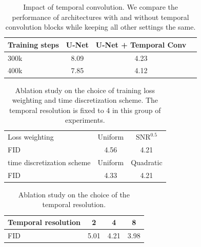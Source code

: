 \begin{table}[ht]
\caption{Impact of temporal convolution. We compare the performance of architectures with and without temporal convolution blocks while keeping all other settings the same. }
\label{tb:cifar_ablation_temporal_conv}
\begin{center}
\begin{small}
\begin{tabular}{lccc}
\toprule
 Training steps & U-Net &  U-Net + Temporal Conv \\
\midrule
300k  & 8.09 & 4.23 \\
400k & 7.85 & 4.12 \\ 
\bottomrule
\end{tabular}
\end{small}
\end{center}
\vskip -0.1in
\end{table}

\begin{table}[ht]
\caption{Ablation study on the choice of training loss weighting and time discretization scheme. The temporal resolution is fixed to 4 in this group of experiments. }
\label{tb:cifar_ablation_loss-weight}
\begin{center}
\begin{small}
\begin{tabular}{lcc}
\toprule
 Loss weighting & Uniform & $\mathrm{SNR}^{0.5}$ \\
FID  & 4.56 & 4.21 \\
\midrule
time discretization scheme & Uniform & Quadratic \\
FID & 4.33 & 4.21 \\
\bottomrule
\end{tabular}
\end{small}
\end{center}
\vskip -0.1in
\end{table}

\begin{table}[ht]
\caption{Ablation study on the choice of the temporal resolution.}
\label{tb:cifar_ablation_resolution}
\begin{center}
\begin{small}
\begin{tabular}{lccc}
\toprule
Temporal resolution & 2 & 4 & 8 \\
\midrule
FID  & 5.01 & 4.21  & 3.98\\
\bottomrule
\end{tabular}
\end{small}
\end{center}
\vskip -0.1in
\end{table}

